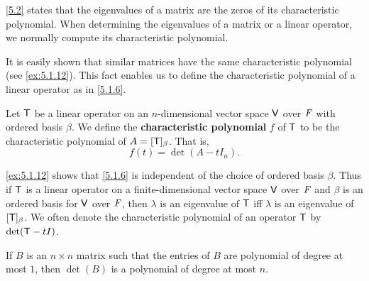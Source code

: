 \begin{note}
	\cref{5.2} states that the eigenvalues of a matrix are the zeros of its characteristic polynomial.
	When determining the eigenvalues of a matrix or a linear operator, we normally compute its characteristic polynomial.
\end{note}

\begin{note}
	It is easily shown that similar matrices have the same characteristic polynomial (see \cref{ex:5.1.12}).
	This fact enables us to define the characteristic polynomial of a linear operator as in \cref{5.1.6}.
\end{note}

\begin{defn}\label{5.1.6}
	Let \(\mathsf{T}\) be a linear operator on an \(n\)-dimensional vector space \(\mathsf{V}\) over \(\mathit{F}\) with ordered basis \(\beta\).
	We define the \textbf{characteristic polynomial} \(f\) of \(\mathsf{T}\) to be the characteristic polynomial of \(A = [\mathsf{T}]_{\beta}\).
	That is,
	\[
		f(t) = \det(A - t I_n).
	\]
\end{defn}

\begin{note}
	\cref{ex:5.1.12} shows that \cref{5.1.6} is independent of the choice of ordered basis \(\beta\).
	Thus if \(\mathsf{T}\) is a linear operator on a finite-dimensional vector space \(\mathsf{V}\) over \(\mathit{F}\) and \(\beta\) is an ordered basis for \(\mathsf{V}\) over \(\mathit{F}\), then \(\lambda\) is an eigenvalue of \(\mathsf{T}\) iff \(\lambda\) is an eigenvalue of \([\mathsf{T}]_{\beta}\).
	We often denote the characteristic polynomial of an operator \(\mathsf{T}\) by \(\det(\mathsf{T} - tI)\).
\end{note}

\begin{lem}\label{5.1.7}
	If \(B\) is an \(n \times n\) matrix such that the entries of \(B\) are polynomial of degree at most \(1\), then \(\det(B)\) is a polynomial of degree at most \(n\).
\end{lem}

